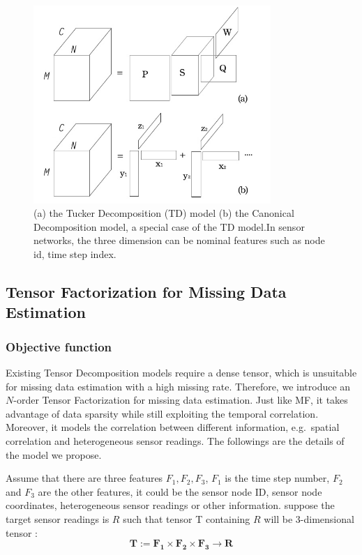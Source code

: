 \begin{figure}[h] 
\includegraphics[width=9cm]{tf.jpg} 
\caption{ (a) the Tucker Decomposition (TD) model (b) the Canonical Decomposition model, a special case of the TD model.In sensor networks, the three dimension can be nominal features such as node id, time step index.} 
\label{fig:tf:tuckcanon} 
\end{figure}

\subsection{Tensor Factorization for Missing Data Estimation} \label{sec:tfmissing}
\subsubsection{Objective function}

Existing Tensor Decomposition models require a dense tensor, which is unsuitable for missing data estimation with a high missing rate.
Therefore, we introduce an $N$-order Tensor Factorization for missing data estimation.
Just like MF, it takes advantage of data sparsity while still exploiting the temporal correlation.
Moreover, it models the correlation between different information, e.g.\ spatial correlation and heterogeneous sensor readings.
The followings are the details of the model we propose.

Assume that there are three features $F_1, F_2 , F_3$, $F_1$ is the time step number, $F_2$ and $F_3$ are the other features, it could be the sensor node ID, sensor node coordinates, heterogeneous sensor readings or other information.
suppose the target sensor readings is $R$ such that tensor T containing  $R$ will be 3-dimensional tensor :
\begin{equation*}
\mathbf{T} := \mathbf{F_1} \times  \mathbf{F_2} \times \mathbf{F_3} \rightarrow \mathbf{R}
\end{equation*}

